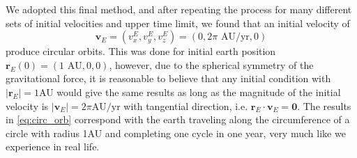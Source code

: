 \documentclass[12pt]{article}
\numberwithin{figure}{section}
\numberwithin{table}{section}
\begin{document}
\noindent We adopted this final method, and after repeating the process for many different sets of initial velocities and upper time limit, we found that an initial velocity of
\begin{equation}
	\mathbf{v}_E=(v_x^E,v_y^E,v_z^E)=(0,2\pi\text{ AU/yr},0)	\label{eq:circ_orb}
\end{equation}
produce circular orbits. This was done for initial earth position $\mathbf{r}_E(0)=(1\text{ AU}, 0,0)$, however, due to the spherical symmetry of the gravitational force, it is reasonable to believe that any initial condition with $|\mathbf{r}_E|=1$AU would give the same results as long as the magnitude of the initial velocity is $|\mathbf{v}_E|=2\pi\text{AU/yr}$ with tangential direction, i.e. $\mathbf{r}_E\cdot\mathbf{v}_E=\mathbf{0}$. The results in \eqref{eq:circ_orb} correspond with the earth traveling along the circumference of a circle with radius 1AU and completing one cycle in one year, very much like we experience in real life.

\end{document}

